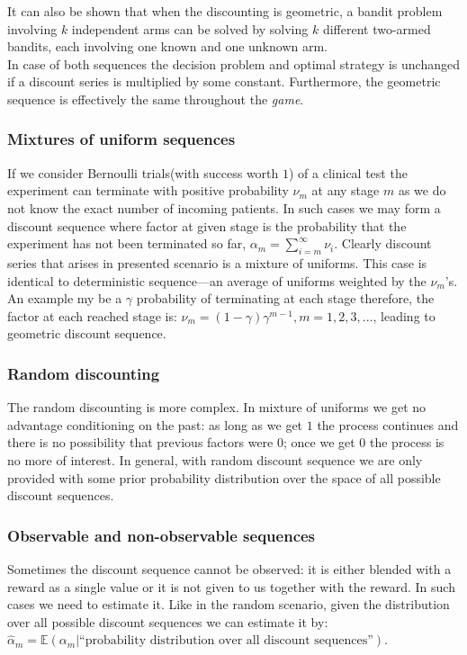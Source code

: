 \documentclass[12pt, a4paper, pdflatex, leqno]{report}
\begin{document}
It can also be shown that when the discounting is geometric, a bandit problem involving $k$ independent arms can be solved by solving $k$ different two-armed bandits, each involving one known and one unknown arm.\\[2cm]



In case of both sequences the decision problem and optimal strategy is unchanged if a discount series is multiplied by some constant. Furthermore, the geometric sequence is effectively the same throughout the \emph{game}.


\subsubsection{Mixtures of uniform sequences}
If we consider Bernoulli trials(with success worth $1$) of a clinical test the experiment can terminate with positive probability $\nu_m$ at any stage $m$ as we do not know the exact number of incoming patients. In such cases we may form a discount sequence where factor at given stage is the probability that the experiment has not been terminated so far, $\alpha_m = \sum_{i=m}^\infty \nu_i$. Clearly discount series that arises in presented scenario is a mixture of uniforms. This case is identical to deterministic sequence---an average of uniforms weighted by the $\nu_m$'s.\\
An example my be a $\gamma$ probability of terminating at each stage therefore, the factor at each reached stage is: $\nu_m = (1-\gamma)\gamma^{m-1}, m=1,2,3,...$, leading to geometric discount sequence.

\subsubsection{Random discounting}
The random discounting is more complex. In mixture of uniforms we get no advantage conditioning on the past: as long as we get $1$ the process continues and there is no possibility that previous factors were $0$; once we get $0$ the process is no more of interest. In general, with random discount sequence we are only provided with some prior probability distribution over the space of all possible discount sequences.\\

\subsubsection{Observable and non-observable sequences}
Sometimes the discount sequence cannot be observed: it is either blended with a reward as a single value or it is not given to us together with the reward. In such cases we need to estimate it. Like in the random scenario, given the distribution over all possible discount sequences we can estimate it by: $\hat{\alpha}_m = \mathbb{E}(\alpha_m | \text{``probability distribution over all discount sequences''})$.\\
\end{document}
